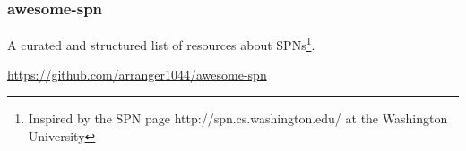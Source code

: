 \documentclass[10pt,t]{beamer}
\begin{document}
\begin{frame}
  \frametitle{awesome-spn}
  A curated and structured list of resources about SPNs\footnote{Inspired by the
    SPN page {http://spn.cs.washington.edu/} at the Washington  University}.

  \url{https://github.com/arranger1044/awesome-spn}
\end{frame}

\end{document}
